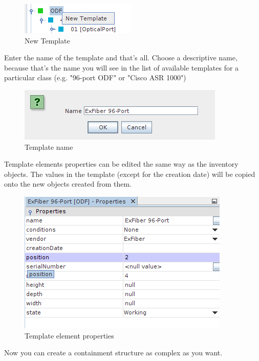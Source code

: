 \documentclass[a4paper]{article}
\begin{document}
	\begin{figure}[h!]
		\centering
		\includegraphics[width=0.4\linewidth]{img/template_manager_new_template.png}
		\caption{New Template}
		\label{fig:template_manager_new_template}
	\end{figure}
	
	Enter the name of the template and that's all. Choose a descriptive name, because that's the name you will see in the list of available templates for a particular class (e.g. "96-port ODF" or "Cisco ASR 1000")
	
	\begin{figure}[h!]
		\centering
		\includegraphics[width=0.6\linewidth]{img/template_manager_template_name.png}
		\caption{Template name}
		\label{fig:template_manager_name}
	\end{figure}
	
	Template elements properties can be edited the same way as the inventory objects. The values in the template (except for the creation date) will be copied onto the new objects created from them.
	\newpage
	\begin{figure}[h!]
		\centering
		\includegraphics[width=0.6\linewidth]{img/template_manager_template_properties.png}
		\caption{Template element properties}
		\label{fig:template_manager_template_properties}
	\end{figure}
	
	Now you can create a containment structure as complex as you want.\\
	
\end{document}
